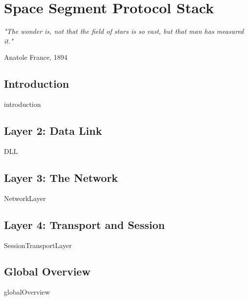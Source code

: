 \chapter{Space Segment Protocol Stack}

%

\epigraph{\textit{"The wonder is, not that the field of stars is so vast, but that man has measured it."}}{Anatole France, 1894} 

\section{Introduction}
{introduction}

\section{Layer 2: Data Link}
{DLL}

\section{Layer 3: The Network}
{NetworkLayer}

\section{Layer 4: Transport and Session}
{SessionTransportLayer}

\section{Global Overview}
{globalOverview}